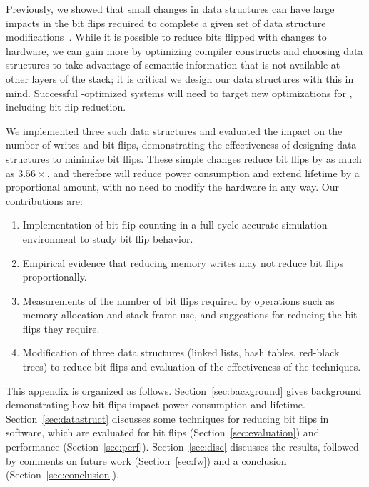 Previously, we showed that small changes in data
structures can have large impacts in the bit flips required to
complete a given set of data structure modifications~\cite{bittman:nvmsa18}.
While it is possible to
reduce bits flipped with changes to hardware, we can gain more
by optimizing compiler constructs and choosing data structures to take advantage
of semantic information that is not available at other layers of the stack;
it is critical we design our data structures with this in mind. Successful \NVM-optimized
systems will need to target new optimizations for \NVM, including bit flip reduction.

We implemented three such
data structures and evaluated the impact on the number of writes and bit flips,
demonstrating the effectiveness of designing data structures to minimize bit
flips.
These simple changes reduce bit flips by as much as $3.56\times$, and therefore will reduce power
consumption and extend lifetime by a proportional amount,
with no need to modify the hardware in any way.
Our contributions are:
\begin{enumerate}
	\item Implementation of bit flip counting in a full cycle-accurate simulation
	      environment to study bit
	      flip behavior.%
	\item Empirical evidence that reducing memory writes may not reduce bit flips
	      proportionally.
	\item Measurements of the number of bit flips required by operations such as
	      memory allocation and stack frame use, and suggestions for reducing the
	      bit flips they require.
	\item Modification of three data structures (linked lists, hash tables, red-black
	      trees) to reduce bit flips and evaluation of the effectiveness of the techniques.
\end{enumerate}

This appendix is organized as follows. Section~\ref{sec:background} gives
background demonstrating how bit flips impact power consumption and
\NVM lifetime. Section~\ref{sec:datastruct} discusses some techniques for
reducing bit flips in software, which are evaluated for bit flips
(Section~\ref{sec:evaluation}) and performance (Section~\ref{sec:perf}).
Section~\ref{sec:disc} discusses the results, followed by comments on
future work (Section~\ref{sec:fw}) and a conclusion
(Section~\ref{sec:conclusion}).

